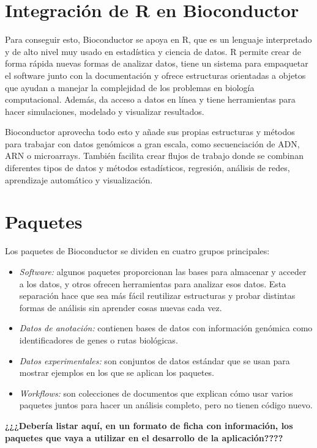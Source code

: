 \section{Integración de R en Bioconductor}
Para conseguir esto, Bioconductor se apoya en R, que es un lenguaje interpretado y de alto nivel muy usado en estadística y ciencia de datos. R permite 
crear de forma rápida nuevas formas de analizar datos, tiene un sistema para empaquetar el software junto con la documentación y ofrece estructuras orientadas a 
objetos que ayudan a manejar la complejidad de los problemas en biología computacional. Además, da acceso a datos en línea y tiene herramientas para 
hacer simulaciones, modelado y visualizar resultados.

Bioconductor aprovecha todo esto y añade sus propias estructuras y métodos para trabajar con datos genómicos a gran escala, como secuenciación de ADN, 
ARN o microarrays. También facilita crear flujos de trabajo donde se combinan diferentes tipos de datos y métodos estadísticos, regresión, análisis de 
redes, aprendizaje automático y visualización.


\section{Paquetes}

Los paquetes de Bioconductor se dividen en cuatro grupos principales:

\begin{itemize}
\item \textit{Software:} algunos paquetes proporcionan las bases para almacenar y acceder a los datos, y otros ofrecen herramientas para analizar esos 
datos. Esta separación hace que sea más fácil reutilizar estructuras y probar distintas formas de análisis sin aprender cosas nuevas cada vez.
\item \textit{Datos de anotación:} contienen bases de datos con información genómica como identificadores de genes o rutas biológicas.
\item \textit{Datos experimentales:} son conjuntos de datos estándar que se usan para mostrar ejemplos en los que se aplican los paquetes.
\item \textit{Workflows:} son colecciones de documentos que explican cómo usar varios paquetes juntos para hacer un análisis completo, pero no tienen 
código nuevo.
\end{itemize}

\textbf{¿¿¿Debería listar aquí, en un formato de ficha con información, los paquetes que vaya a utilizar en el desarrollo de la aplicación????}

